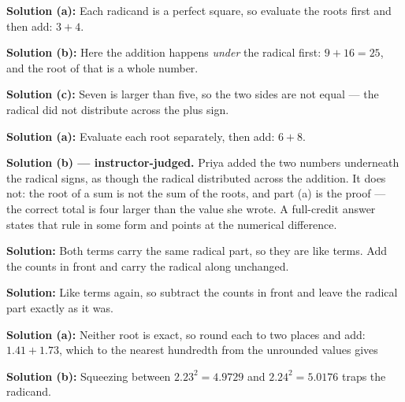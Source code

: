 \documentclass[12pt]{article}
\begin{document}




\textbf{Solution (a):} \quad Each radicand is a perfect square, so evaluate the roots
first and then add: $3 + 4$. 

\textbf{Solution (b):} \quad Here the addition happens \emph{under} the radical first:
$9 + 16 = 25$, and the root of that is a whole number. 

\textbf{Solution (c):} \quad Seven is larger than five, so the two sides are not equal ---
the radical did not distribute across the plus sign. \ans{>}


\textbf{Solution (a):} \quad Evaluate each root separately, then add: $6 + 8$. 

\textbf{Solution (b) --- instructor-judged.} \quad Priya added the two numbers underneath
the radical signs, as though the radical distributed across the addition. It does not: the
root of a sum is not the sum of the roots, and part (a) is the proof --- the correct total
is four larger than the value she wrote. A full-credit answer states that rule in some form
and points at the numerical difference.


\textbf{Solution:} \quad Both terms carry the same radical part, so they are like terms.
Add the counts in front and carry the radical along unchanged. 


\textbf{Solution:} \quad Like terms again, so subtract the counts in front and leave the
radical part exactly as it was. 


\textbf{Solution (a):} \quad Neither root is exact, so round each to two places and add:
$1.41 + 1.73$, which to the nearest hundredth from the unrounded values gives 

\textbf{Solution (b):} \quad Squeezing between $2.23^2 = 4.9729$ and $2.24^2 = 5.0176$
traps the radicand. 
\end{document}
